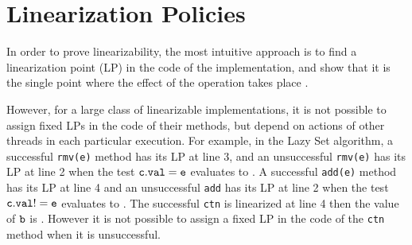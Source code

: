 \section{Linearization Policies}
\label{controllers:subsection}
In order to prove linearizability, the most intuitive approach is to find a linearization point (LP) in the code of the implementation, and show that it is the single point where the effect of the operation takes place \cite{AHHR:integrated:rep,BLMRS:cav08,Vafeiadis}.

However, for a large class of linearizable implementations,
it is not possible to assign fixed LPs in the code of their methods, 
but depend on actions of other threads in each particular execution. For example, 
in the Lazy Set algorithm, a successful {\tt rmv(e)} method has its LP at line 3, and an unsuccessful {\tt rmv(e)} has its LP at line 2 when the test $\tt c.val = e$ evaluates to \false. A successful {\tt add(e)} method has its LP at line 4 and an unsuccessful {\tt add} has its LP at line 2 when the test $\tt c.val != e$ evaluates to \false\;. The successful {\tt ctn} is linearized at line 4 then the value of $\tt b$ is \true. 
However it is not possible to assign a fixed LP in the code of the {\tt ctn} method when it is unsuccessful. 

